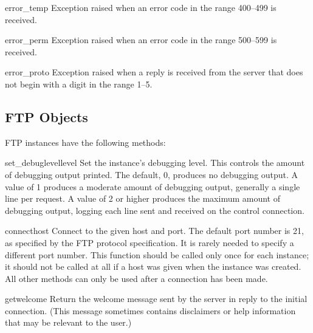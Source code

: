 \begin{excdesc}{error_temp}
Exception raised when an error code in the range 400--499 is received.
\end{excdesc}

\begin{excdesc}{error_perm}
Exception raised when an error code in the range 500--599 is received.
\end{excdesc}

\begin{excdesc}{error_proto}
Exception raised when a reply is received from the server that does
not begin with a digit in the range 1--5.
\end{excdesc}

\subsection{FTP Objects}

FTP instances have the following methods:

\renewcommand{\indexsubitem}{(FTP object method)}

\begin{funcdesc}{set_debuglevel}{level}
Set the instance's debugging level.  This controls the amount of
debugging output printed.  The default, 0, produces no debugging
output.  A value of 1 produces a moderate amount of debugging output,
generally a single line per request.  A value of 2 or higher produces
the maximum amount of debugging output, logging each line sent and
received on the control connection.
\end{funcdesc}

\begin{funcdesc}{connect}{host}
Connect to the given host and port.  The default port number is 21, as
specified by the FTP protocol specification.  It is rarely needed to
specify a different port number.  This function should be called only
once for each instance; it should not be called at all if a host was
given when the instance was created.  All other methods can only be
used after a connection has been made.
\end{funcdesc}

\begin{funcdesc}{getwelcome}{}
Return the welcome message sent by the server in reply to the initial
connection.  (This message sometimes contains disclaimers or help
information that may be relevant to the user.)
\end{funcdesc}

